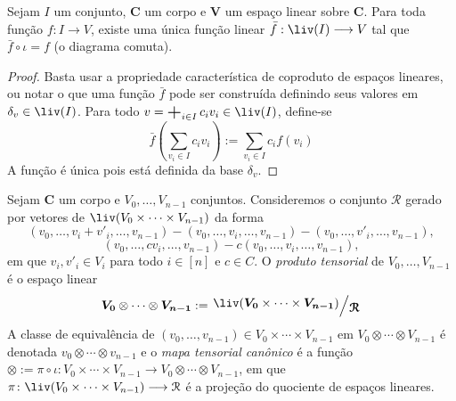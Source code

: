 \begin{prop}
Sejam $I$ um conjunto, $\bm C$ um corpo e $\bm V$ um espaço linear sobre $\bm C$. Para toda função $f: I \to V$, existe uma única função linear $\bar f: \liv(I) \to V$ tal que $\bar f \circ \iota = f$ (o diagrama comuta).
\begin{figure}
\centering
{}
\end{figure}
\end{prop}
\begin{proof} Basta usar a propriedade característica de coproduto de espaços lineares, ou notar o que uma função $\bar f$ pode ser construída definindo seus valores em $\delta_v \in \liv(I)$. Para todo $v=\sum_{i \in I} c_i v_i \in \liv(I)$, define-se
	\begin{equation*}
	\bar f\left(\sum_{v_i \in I} c_i v_i\right):= \sum_{v_i \in I} c_i f(v_i)
	\end{equation*}
A função é única pois está definida da base $\delta_v$.
\end{proof}

\begin{defi}
Sejam $\bm C$ um corpo e $V_0,\ldots,V_{n-1}$ conjuntos. Consideremos o conjunto $\mathcal R$ gerado por vetores de $\liv(V_0 \times \cdots \times V_{n-1})$ da forma
	\begin{equation*}
	(v_0,\ldots,v_i+v'_i,\ldots,v_{n-1}) - (v_0,\ldots,v_i,\ldots,v_{n-1}) - (v_0,\ldots,v'_i,\ldots,v_{n-1}),
	\end{equation*}
	\begin{equation*}
	(v_0,\ldots,cv_i,\ldots,v_{n-1}) - c(v_0,\ldots,v_i,\ldots,v_{n-1}),
	\end{equation*}
em que $v_i,v'_i \in V_i$ para todo $i \in [n]$ e $c \in C$. O \emph{produto tensorial} de $V_0,\ldots,V_{n-1}$ é o espaço linear
	\begin{equation*}
	\bm{V_0} \otimes \cdots \otimes \bm{V_{n-1}} := \quo{\liv(\bm{V_0} \times \cdots \times \bm{V_{n-1}})}{\bm{\mathcal R}}
	\end{equation*}
A classe de equivalência de $(v_0,\ldots,v_{n-1}) \in V_0 \times \cdots \times V_{n-1}$ em $V_0 \otimes \cdots \otimes V_{n-1}$ é denotada $v_0 \otimes \cdots \otimes v_{n-1}$ e o \emph{mapa tensorial canônico} é a função $\otimes := \pi \circ \iota\colon V_0 \times \cdots \times V_{n-1} \to  V_0 \otimes \cdots \otimes V_{n-1}$, em que $\pi\colon \liv(V_0 \times \cdots \times V_{n-1}) \to \mathcal R$ é a projeção do quociente de espaços lineares.
\end{defi}

